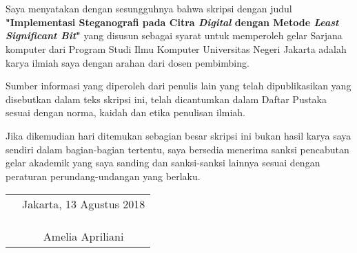 \chapter*{}

Saya menyatakan dengan sesungguhnya bahwa skripsi dengan judul \textbf{"Implementasi Steganografi pada Citra \emph{Digital} dengan Metode \emph{Least Significant Bit}"} yang disusun sebagai syarat untuk memperoleh gelar Sarjana komputer dari Program Studi Ilmu Komputer Universitas Negeri Jakarta adalah karya ilmiah saya dengan arahan dari dosen pembimbing.

Sumber informasi yang diperoleh dari penulis lain yang
telah dipublikasikan yang disebutkan dalam teks skripsi ini, telah dicantumkan dalam Daftar Pustaka sesuai dengan norma, kaidah dan etika penulisan ilmiah.

Jika dikemudian hari ditemukan sebagian besar skripsi ini bukan hasil karya saya sendiri dalam bagian-bagian tertentu, saya bersedia menerima sanksi pencabutan gelar akademik yang saya sanding dan sanksi-sanksi lainnya sesuai dengan peraturan perundang-undangan yang berlaku.

\vspace{.5cm}

\begin{tabular}{p{7.5cm}c}
	&Jakarta, 13 Agustus 2018\\
	&\\
	&\\
	&\\
	&Amelia Apriliani
\end{tabular}